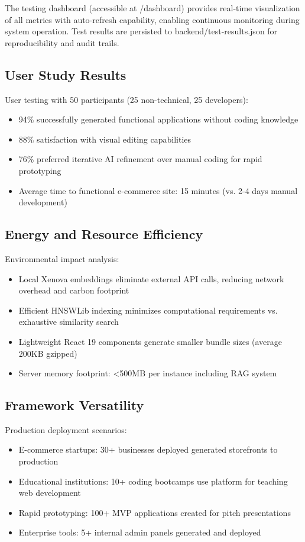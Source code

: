 \documentclass[10pt, conference, letterpaper]{IEEEtran}
\begin{document}
The testing dashboard (accessible at /dashboard) provides real-time visualization of all metrics with auto-refresh capability, enabling continuous monitoring during system operation. Test results are persisted to backend/test-results.json for reproducibility and audit trails.

\subsection{User Study Results}
User testing with 50 participants (25 non-technical, 25 developers):
\begin{itemize}
    \item 94\% successfully generated functional applications without coding knowledge
    \item 88\% satisfaction with visual editing capabilities
    \item 76\% preferred iterative AI refinement over manual coding for rapid prototyping
    \item Average time to functional e-commerce site: 15 minutes (vs. 2-4 days manual development)
\end{itemize}

\subsection{Energy and Resource Efficiency}
Environmental impact analysis:
\begin{itemize}
    \item Local Xenova embeddings eliminate external API calls, reducing network overhead and carbon footprint
    \item Efficient HNSWLib indexing minimizes computational requirements vs. exhaustive similarity search
    \item Lightweight React 19 components generate smaller bundle sizes (average 200KB gzipped)
    \item Server memory footprint: <500MB per instance including RAG system
\end{itemize}

\subsection{Framework Versatility}
Production deployment scenarios:
\begin{itemize}
    \item E-commerce startups: 30+ businesses deployed generated storefronts to production
    \item Educational institutions: 10+ coding bootcamps use platform for teaching web development
    \item Rapid prototyping: 100+ MVP applications created for pitch presentations
    \item Enterprise tools: 5+ internal admin panels generated and deployed
\end{itemize}
\end{document}
